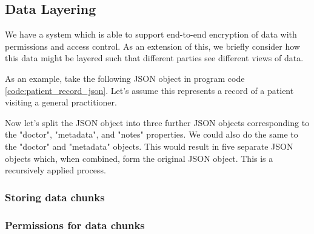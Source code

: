 \subsection{Data Layering}

We have a system which is able to support end-to-end encryption of data with permissions and access control. As an extension of this, we briefly consider how this data might be layered such that different parties see different views of data.

As an example, take the following JSON object in program code \ref{code:patient_record_json}. Let's assume this represents a record of a patient visiting a general practitioner.



Now let's split the JSON object into three further JSON objects corresponding to the "doctor", "metadata", and "notes" properties. We could also do the same to the "doctor" and "metadata" objects. This would result in five separate JSON objects which, when combined, form the original JSON object. This is a recursively applied process.

\subsubsection{Storing data chunks}



\subsubsection{Permissions for data chunks}
